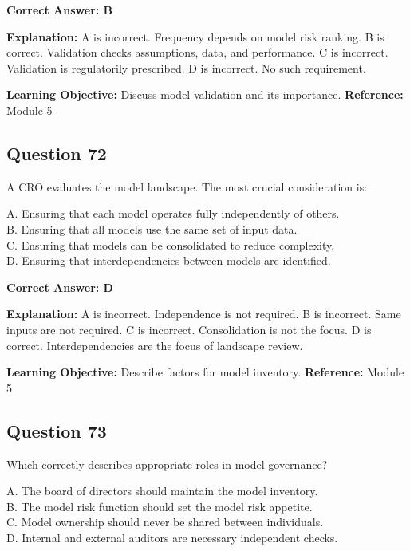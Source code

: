 \documentclass[11pt]{article}
\begin{document}
	\vspace{0.4em}
	\textbf{Correct Answer: B}
	
	\textbf{Explanation:}
	A is incorrect. Frequency depends on model risk ranking.
	B is correct. Validation checks assumptions, data, and performance.
	C is incorrect. Validation is regulatorily prescribed.
	D is incorrect. No such requirement.
	
	\textbf{Learning Objective:} Discuss model validation and its importance.
	\textbf{Reference:} Module 5
	
	\subsection*{Question 72}
	A CRO evaluates the model landscape. The most crucial consideration is:
	
	A. Ensuring that each model operates fully independently of others.\\
	B. Ensuring that all models use the same set of input data.\\
	C. Ensuring that models can be consolidated to reduce complexity.\\
	D. Ensuring that interdependencies between models are identified.
	
	\vspace{0.4em}
	\textbf{Correct Answer: D}
	
	\textbf{Explanation:}
	A is incorrect. Independence is not required.
	B is incorrect. Same inputs are not required.
	C is incorrect. Consolidation is not the focus.
	D is correct. Interdependencies are the focus of landscape review.
	
	\textbf{Learning Objective:} Describe factors for model inventory.
	\textbf{Reference:} Module 5
	
	\subsection*{Question 73}
	Which correctly describes appropriate roles in model governance?
	
	A. The board of directors should maintain the model inventory.\\
	B. The model risk function should set the model risk appetite.\\
	C. Model ownership should never be shared between individuals.\\
	D. Internal and external auditors are necessary independent checks.
	
\end{document}
